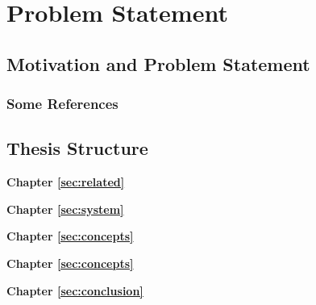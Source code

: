 %
\chapter{Problem Statement}
\label{sec:problem-statement}


\Blindtext[2][2]

%
%
%

\section{Motivation and Problem Statement}
\label{sec:problem-statement:motivation}

\Blindtext[3][1] \cite{Jurgens:2000,Jurgens:1995,Miede:2011,Kohm:2011,Apple:keynote:2010,Apple:numbers:2010,Apple:pages:2010}

%

\subsection{Some References}
\label{sec:problem-statement:results:refs}
\cite{WEB:GNU:GPL:2010,WEB:Miede:2011}

\section{Thesis Structure}
\label{sec:problem-statement:structure}

\textbf{Chapter \ref{sec:related}} \\[0.2em]
\blindtext

\textbf{Chapter \ref{sec:system}} \\[0.2em]
\blindtext

\textbf{Chapter \ref{sec:concepts}} \\[0.2em]
\blindtext

\textbf{Chapter \ref{sec:concepts}} \\[0.2em]
\blindtext

\textbf{Chapter \ref{sec:conclusion}} \\[0.2em]
\blindtext
